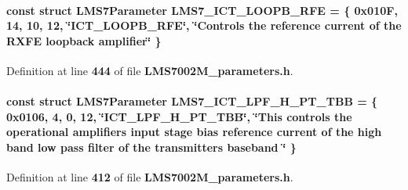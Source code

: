 \paragraph[{L\+M\+S7\+\_\+\+I\+C\+T\+\_\+\+L\+O\+O\+P\+B\+\_\+\+R\+FE}]{\setlength{\rightskip}{0pt plus 5cm}const struct {\bf L\+M\+S7\+Parameter} L\+M\+S7\+\_\+\+I\+C\+T\+\_\+\+L\+O\+O\+P\+B\+\_\+\+R\+FE = \{ 0x010\+F, 14, 10, 12, \char`\"{}\+I\+C\+T\+\_\+\+L\+O\+O\+P\+B\+\_\+\+R\+F\+E\char`\"{}, \char`\"{}\+Controls the reference current of the R\+X\+F\+E loopback amplifier\char`\"{} \}\hspace{0.3cm}{\ttfamily [static]}}\label{LMS7002M__parameters_8h_a919d601210ad2159e10d2c9f9c75bcd7}


Definition at line {\bf 444} of file {\bf L\+M\+S7002\+M\+\_\+parameters.\+h}.

\paragraph[{L\+M\+S7\+\_\+\+I\+C\+T\+\_\+\+L\+P\+F\+\_\+\+H\+\_\+\+P\+T\+\_\+\+T\+BB}]{\setlength{\rightskip}{0pt plus 5cm}const struct {\bf L\+M\+S7\+Parameter} L\+M\+S7\+\_\+\+I\+C\+T\+\_\+\+L\+P\+F\+\_\+\+H\+\_\+\+P\+T\+\_\+\+T\+BB = \{ 0x0106, 4, 0, 12, \char`\"{}\+I\+C\+T\+\_\+\+L\+P\+F\+\_\+\+H\+\_\+\+P\+T\+\_\+\+T\+B\+B\char`\"{}, \char`\"{}\+This controls the operational amplifiers input stage bias reference current of the high band low pass filter of the transmitter\textquotesingle{}s baseband \char`\"{} \}\hspace{0.3cm}{\ttfamily [static]}}\label{LMS7002M__parameters_8h_a881a13705e1f842f3ac1705fbeebb0c9}


Definition at line {\bf 412} of file {\bf L\+M\+S7002\+M\+\_\+parameters.\+h}.

